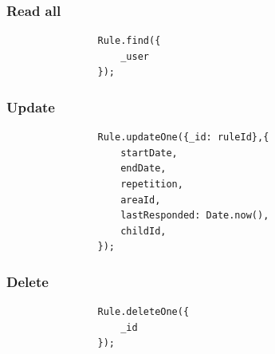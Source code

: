\documentclass{sprawozdanie-agh}
\begin{document}
		\subsubsection{Read all}
			\begin{lstlisting}
				Rule.find({
					_user
				});
			\end{lstlisting}
		
		\subsubsection{Update}
			\begin{lstlisting}
				Rule.updateOne({_id: ruleId},{
					startDate,
					endDate,
					repetition,
					areaId,
					lastResponded: Date.now(),
					childId,
				});
			\end{lstlisting}
		
		\subsubsection{Delete}
			\begin{lstlisting}
				Rule.deleteOne({
					_id
				});
			\end{lstlisting}
\end{document}
